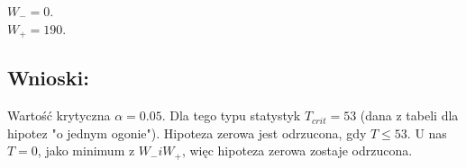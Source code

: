     $W_{-} = 0$.\\
    $W_{+} = 190$. \\
  \subsection{Wnioski: }
    Wartość krytyczna $\alpha = 0.05$. Dla tego typu statystyk $T_{crit}=53$ (dana z tabeli dla hipotez "o jednym ogonie"). Hipoteza zerowa jest odrzucona, gdy $ T \leq 53 $. U nas $T=0$, jako minimum z $W_{-} i W_{+}$, więc hipoteza zerowa zostaje odrzucona.